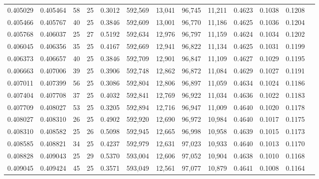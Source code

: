 \begin{tabular}{rrrrrrrrrrrrr}
0.405029 & 0.405464 &    58 &  25 &                                     0.3012 & 592,569 &  13,041 &  96,745 &  11,211 & 0.4623 & 0.1038 & 0.1208 \\
0.405466 & 0.405767 &    40 &  25 &                                     0.3846 & 592,609 &  13,001 &  96,770 &  11,186 & 0.4625 & 0.1036 & 0.1204 \\
0.405768 & 0.406037 &    25 &  27 &                                     0.5192 & 592,634 &  12,976 &  96,797 &  11,159 & 0.4624 & 0.1034 & 0.1202 \\
0.406045 & 0.406356 &    35 &  25 &                                     0.4167 & 592,669 &  12,941 &  96,822 &  11,134 & 0.4625 & 0.1031 & 0.1199 \\
0.406373 & 0.406657 &    40 &  25 &                                     0.3846 & 592,709 &  12,901 &  96,847 &  11,109 & 0.4627 & 0.1029 & 0.1195 \\
0.406663 & 0.407006 &    39 &  25 &                                     0.3906 & 592,748 &  12,862 &  96,872 &  11,084 & 0.4629 & 0.1027 & 0.1191 \\
0.407011 & 0.407399 &    56 &  25 &                                     0.3086 & 592,804 &  12,806 &  96,897 &  11,059 & 0.4634 & 0.1024 & 0.1186 \\
0.407404 & 0.407708 &    37 &  25 &                                     0.4032 & 592,841 &  12,769 &  96,922 &  11,034 & 0.4636 & 0.1022 & 0.1183 \\
0.407709 & 0.408027 &    53 &  25 &                                     0.3205 & 592,894 &  12,716 &  96,947 &  11,009 & 0.4640 & 0.1020 & 0.1178 \\
0.408027 & 0.408310 &    26 &  25 &                                     0.4902 & 592,920 &  12,690 &  96,972 &  10,984 & 0.4640 & 0.1017 & 0.1175 \\
0.408310 & 0.408582 &    25 &  26 &                                     0.5098 & 592,945 &  12,665 &  96,998 &  10,958 & 0.4639 & 0.1015 & 0.1173 \\
0.408585 & 0.408821 &    34 &  25 &                                     0.4237 & 592,979 &  12,631 &  97,023 &  10,933 & 0.4640 & 0.1013 & 0.1170 \\
0.408828 & 0.409043 &    25 &  29 &                                     0.5370 & 593,004 &  12,606 &  97,052 &  10,904 & 0.4638 & 0.1010 & 0.1168 \\
0.409045 & 0.409424 &    45 &  25 &                                     0.3571 & 593,049 &  12,561 &  97,077 &  10,879 & 0.4641 & 0.1008 & 0.1164 \\

\end{tabular}
